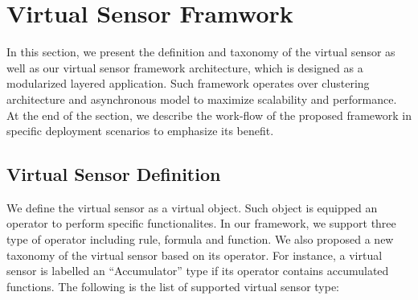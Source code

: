 \section{Virtual Sensor Framwork}

In this section, we present the definition and taxonomy of the virtual sensor as well as our virtual sensor framework architecture, which is designed as a modularized layered application. Such framework operates over clustering architecture and asynchronous model to maximize scalability and performance. At the end of the section, we describe the work-flow of the proposed framework in specific deployment scenarios to emphasize its benefit.

\subsection{Virtual Sensor Definition}
We define the virtual sensor as a virtual object. Such object is equipped an operator to perform specific functionalites. In our framework, we support three type of operator including rule, formula and function. We also proposed a new taxonomy of the virtual sensor based on its operator. For instance, a virtual sensor is labelled an “Accumulator” type if its operator contains accumulated functions. The following is the list of supported virtual sensor type:
